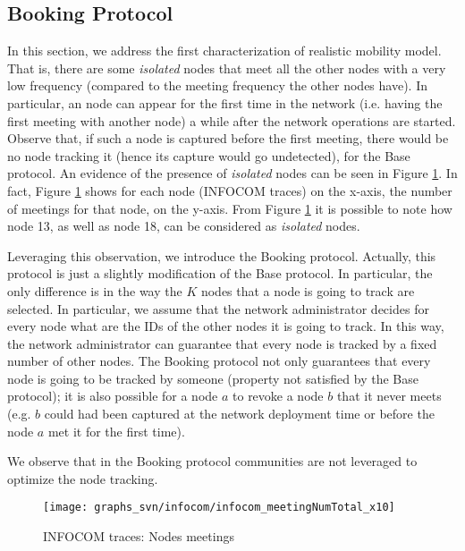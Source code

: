 \documentclass{IEEEconf}
\begin{document}
\subsection{Booking Protocol}
\label{booking}

In this section, we address the first characterization of realistic mobility model.
That is, there are some \textit{isolated} nodes that meet all the other nodes with a very low frequency (compared to the meeting frequency the other nodes have).
In particular,
an  node can appear for the first time in the network (i.e. having the first meeting with another node) a while after the network operations are started.
Observe that, if such a node is captured before the first meeting, there would be no node tracking it (hence its capture would go undetected), for the Base protocol.
An evidence of the presence of \textit{isolated} nodes can be seen in Figure \ref{INFOCOM:meetings}. In fact, Figure \ref{INFOCOM:meetings} shows for each node (INFOCOM traces) on the x-axis, the number of meetings for that node, on the y-axis. From Figure \ref{INFOCOM:meetings} it is possible to note how node 13, as well as node 18, can be considered as \textit{isolated} nodes.

Leveraging  this observation, we introduce the Booking protocol.
Actually, this protocol is just a slightly modification of the Base protocol. In particular, the only difference is in the way the $K$ nodes that a node is going to track are selected.
In particular, we assume that the network administrator decides for every node what are the IDs of the other nodes it is going to track. In this way, the network administrator can guarantee that every node is tracked by a fixed number of other nodes.
The Booking protocol not only guarantees that every node is going to be tracked by someone (property not satisfied by the Base protocol); it is also possible for a node $a$ to revoke a node $b$ that it never meets (e.g. $b$ could had been captured at the network deployment time or before the node $a$ met it for the first time).

We observe that in the Booking protocol communities are not  leveraged  to optimize the node tracking.




\begin{figure}
\begin{center}
\texttt{[image: graphs\_svn/infocom/infocom\_meetingNumTotal\_x10]}
\end{center}
\caption{\label{INFOCOM:meetings}INFOCOM traces: Nodes meetings}
\end{figure}
\end{document}
